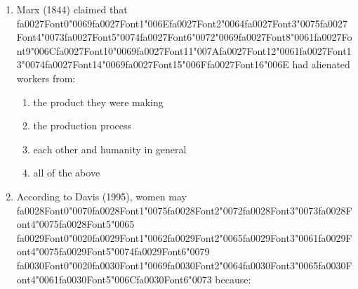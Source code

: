 \documentclass[12pt]{article}
\begin{document}
\begin{enumerate}[label=\arabic*.]
\begin{enumerate}[label=(\alph*)]
    \item Prime Minister, Archbishop of York, Viscounts of England
    \item Marquesses of England, Earls of Great Britain, King's Brothers
    \item Esquires, Serjeants of Law, Dukes' Eldest Sons
    \item King's Grandsons, Lord High Treasurer, Companions of the Bath
\end{enumerate}
\item Marx (1844) claimed that {\csname fa0027Font0\endcsname\char"0069}{\csname fa0027Font1\endcsname\char"006E}{\csname fa0027Font2\endcsname\char"0064}{\csname fa0027Font3\endcsname\char"0075}{\csname fa0027Font4\endcsname\char"0073}{\csname fa0027Font5\endcsname\char"0074}{\csname fa0027Font6\endcsname\char"0072}{\char"0069}{\csname fa0027Font8\endcsname\char"0061}{\csname fa0027Font9\endcsname\char"006C}{\csname fa0027Font10\endcsname\char"0069}{\csname fa0027Font11\endcsname\char"007A}{\csname fa0027Font12\endcsname\char"0061}{\csname fa0027Font13\endcsname\char"0074}{\csname fa0027Font14\endcsname\char"0069}{\csname fa0027Font15\endcsname\char"006F}{\csname fa0027Font16\endcsname\char"006E} had alienated workers from:
\begin{enumerate}[label=(\alph*)]
    \item the product they were making
    \item the production process
    \item each other and humanity in general
    \item all of the above
\end{enumerate}
\item According to Davis (1995), women may {\csname fa0028Font0\endcsname\char"0070}{\csname fa0028Font1\endcsname\char"0075}{\csname fa0028Font2\endcsname\char"0072}{\csname fa0028Font3\endcsname\char"0073}{\csname fa0028Font4\endcsname\char"0075}{\csname fa0028Font5\endcsname\char"0065} {\csname fa0029Font0\endcsname\char"0020}{\csname fa0029Font1\endcsname\char"0062}{\csname fa0029Font2\endcsname\char"0065}{\csname fa0029Font3\endcsname\char"0061}{\csname fa0029Font4\endcsname\char"0075}{\csname fa0029Font5\endcsname\char"0074}{\csname fa0029Font6\endcsname\char"0079} {\csname fa0030Font0\endcsname\char"0020}{\csname fa0030Font1\endcsname\char"0069}{\csname fa0030Font2\endcsname\char"0064}{\csname fa0030Font3\endcsname\char"0065}{\csname fa0030Font4\endcsname\char"0061}{\csname fa0030Font5\endcsname\char"006C}{\csname fa0030Font6\endcsname\char"0073} because:

\end{enumerate}
\end{document}

